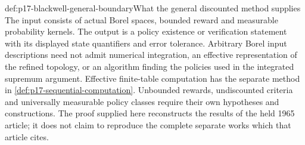 \begin{proofboundary}{def:p17-blackwell-general-boundary}{What the general discounted method supplies}
The input consists of actual Borel spaces, bounded reward and measurable
probability kernels. The output is a policy existence or verification
statement with its displayed state quantifiers and error tolerance.
Arbitrary Borel input descriptions need not admit numerical integration,
an effective representation of the refined topology, or an algorithm
finding the policies used in the integrated supremum argument.
Effective finite-table computation has the separate method in
\cref{def:p17-sequential-computation}.
Unbounded rewards, undiscounted criteria and universally measurable
policy classes require their own hypotheses and constructions.
The proof supplied here reconstructs the results of the held 1965
article; it does not claim to reproduce the complete separate works
which that article cites.
\end{proofboundary}
